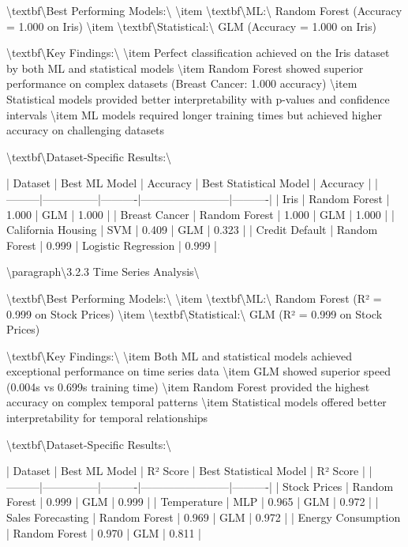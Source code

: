 \documentclass[11pt,a4paper]{article}
\begin{document}
\textbackslash{}textbf\textbackslash{}{Best Performing Models:\textbackslash{}}
\textbackslash{}item \textbackslash{}textbf\textbackslash{}{ML:\textbackslash{}} Random Forest (Accuracy = 1.000 on Iris)
\textbackslash{}item \textbackslash{}textbf\textbackslash{}{Statistical:\textbackslash{}} GLM (Accuracy = 1.000 on Iris)

\textbackslash{}textbf\textbackslash{}{Key Findings:\textbackslash{}}
\textbackslash{}item Perfect classification achieved on the Iris dataset by both ML and statistical models
\textbackslash{}item Random Forest showed superior performance on complex datasets (Breast Cancer: 1.000 accuracy)
\textbackslash{}item Statistical models provided better interpretability with p-values and confidence intervals
\textbackslash{}item ML models required longer training times but achieved higher accuracy on challenging datasets

\textbackslash{}textbf\textbackslash{}{Dataset-Specific Results:\textbackslash{}}

| Dataset | Best ML Model | Accuracy | Best Statistical Model | Accuracy |
|---------|---------------|----------|------------------------|----------|
| Iris | Random Forest | 1.000 | GLM | 1.000 |
| Breast Cancer | Random Forest | 1.000 | GLM | 1.000 |
| California Housing | SVM | 0.409 | GLM | 0.323 |
| Credit Default | Random Forest | 0.999 | Logistic Regression | 0.999 |

\textbackslash{}paragraph\textbackslash{}{3.2.3 Time Series Analysis\textbackslash{}}

\textbackslash{}textbf\textbackslash{}{Best Performing Models:\textbackslash{}}
\textbackslash{}item \textbackslash{}textbf\textbackslash{}{ML:\textbackslash{}} Random Forest (R² = 0.999 on Stock Prices)
\textbackslash{}item \textbackslash{}textbf\textbackslash{}{Statistical:\textbackslash{}} GLM (R² = 0.999 on Stock Prices)

\textbackslash{}textbf\textbackslash{}{Key Findings:\textbackslash{}}
\textbackslash{}item Both ML and statistical models achieved exceptional performance on time series data
\textbackslash{}item GLM showed superior speed (0.004s vs 0.699s training time)
\textbackslash{}item Random Forest provided the highest accuracy on complex temporal patterns
\textbackslash{}item Statistical models offered better interpretability for temporal relationships

\textbackslash{}textbf\textbackslash{}{Dataset-Specific Results:\textbackslash{}}

| Dataset | Best ML Model | R² Score | Best Statistical Model | R² Score |
|---------|---------------|----------|------------------------|----------|
| Stock Prices | Random Forest | 0.999 | GLM | 0.999 |
| Temperature | MLP | 0.965 | GLM | 0.972 |
| Sales Forecasting | Random Forest | 0.969 | GLM | 0.972 |
| Energy Consumption | Random Forest | 0.970 | GLM | 0.811 |
\end{document}
